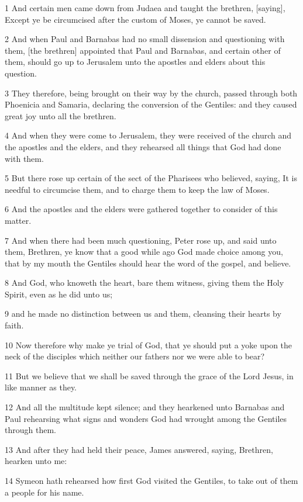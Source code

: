 \par 1 And certain men came down from Judaea and taught the brethren, [saying], Except ye be circumcised after the custom of Moses, ye cannot be saved.
\par 2 And when Paul and Barnabas had no small dissension and questioning with them, [the brethren] appointed that Paul and Barnabas, and certain other of them, should go up to Jerusalem unto the apostles and elders about this question.
\par 3 They therefore, being brought on their way by the church, passed through both Phoenicia and Samaria, declaring the conversion of the Gentiles: and they caused great joy unto all the brethren.
\par 4 And when they were come to Jerusalem, they were received of the church and the apostles and the elders, and they rehearsed all things that God had done with them.
\par 5 But there rose up certain of the sect of the Pharisees who believed, saying, It is needful to circumcise them, and to charge them to keep the law of Moses.
\par 6 And the apostles and the elders were gathered together to consider of this matter.
\par 7 And when there had been much questioning, Peter rose up, and said unto them, Brethren, ye know that a good while ago God made choice among you, that by my mouth the Gentiles should hear the word of the gospel, and believe.
\par 8 And God, who knoweth the heart, bare them witness, giving them the Holy Spirit, even as he did unto us;
\par 9 and he made no distinction between us and them, cleansing their hearts by faith.
\par 10 Now therefore why make ye trial of God, that ye should put a yoke upon the neck of the disciples which neither our fathers nor we were able to bear?
\par 11 But we believe that we shall be saved through the grace of the Lord Jesus, in like manner as they.
\par 12 And all the multitude kept silence; and they hearkened unto Barnabas and Paul rehearsing what signs and wonders God had wrought among the Gentiles through them.
\par 13 And after they had held their peace, James answered, saying, Brethren, hearken unto me:
\par 14 Symeon hath rehearsed how first God visited the Gentiles, to take out of them a people for his name.
